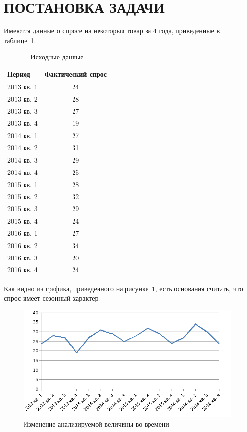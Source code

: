\section{ПОСТАНОВКА ЗАДАЧИ}

Имеются данные о спросе на некоторый товар за 4 года,
приведенные в таблице~\ref{tbl:source_data}.

\begin{table} [h!]
  \caption{
    Исходные данные
  }\label{tbl:source_data}
    \begin{tabular}{| m{11.4cm} | c |}
      \hline
      Период & Фактический спрос \\ \hline

      2013 кв. 1 & 24 \\ \hline
      2013 кв. 2 & 28 \\ \hline
      2013 кв. 3 & 27 \\ \hline
      2013 кв. 4 & 19 \\ \hline

      2014 кв. 1 & 27 \\ \hline
      2014 кв. 2 & 31 \\ \hline
      2014 кв. 3 & 29 \\ \hline
      2014 кв. 4 & 25 \\ \hline

      2015 кв. 1 & 28 \\ \hline
      2015 кв. 2 & 32 \\ \hline
      2015 кв. 3 & 29 \\ \hline
      2015 кв. 4 & 24 \\ \hline

      2016 кв. 1 & 27 \\ \hline
      2016 кв. 2 & 34 \\ \hline
      2016 кв. 3 & 20 \\ \hline
      2016 кв. 4 & 24 \\ \hline
    \end{tabular}
\end{table}

Как видно из графика, приведенного на рисунке~\ref{fig:source_data}, есть основания считать, что спрос имеет сезонный характер.

\begin{figure}[h!]
  \centering
  \includegraphics[width=150mm]{pic/source_data}
  \caption{Изменение анализируемой величины во времени}
  \label{fig:source_data}
\end{figure}

